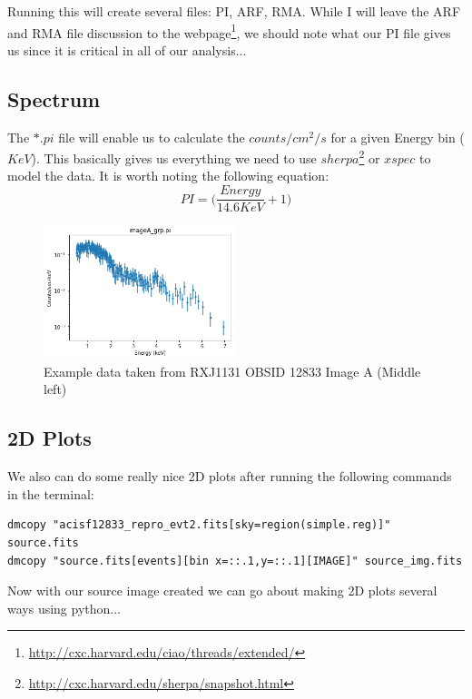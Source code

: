 \documentclass[11pt,letterpaper]{article}
\begin{document}
Running this will create several files: PI, ARF, RMA.
While I will leave the ARF and RMA file discussion to the webpage\footnote{\href{http://cxc.harvard.edu/ciao/threads/extended/}{http://cxc.harvard.edu/ciao/threads/extended/}}, we should note what our PI file gives us since it is critical in all of our analysis...
\subsection{Spectrum}
The $*.pi$ file will enable us to calculate the $counts/cm^2/s$ for a given Energy bin ($KeV$). This basically gives us everything we need to use $sherpa$\footnote{\href{http://cxc.harvard.edu/sherpa/snapshot.html}{http://cxc.harvard.edu/sherpa/snapshot.html}} or $xspec$ to model the data. It is worth noting the following equation:
\begin{equation}
PI = \Bigg( \frac{Energy}{14.6KeV}+1 \Bigg)
\end{equation}

\begin{figure}[h]
	\centering
	\includegraphics[width=0.5\textwidth]{pictures/imageA_grp}
	\caption{Example data taken from RXJ1131 OBSID 12833 Image A (Middle left)}
	\label{fig:exampleSherpa}
\end{figure}
\subsection{2D Plots}
We also can do some really nice 2D plots after running the following commands in the terminal:
\begin{lstlisting}
dmcopy "acisf12833_repro_evt2.fits[sky=region(simple.reg)]" source.fits
dmcopy "source.fits[events][bin x=::.1,y=::.1][IMAGE]" source_img.fits
\end{lstlisting}
Now with our source image created we can go about making 2D plots several ways using python...
\end{document}
